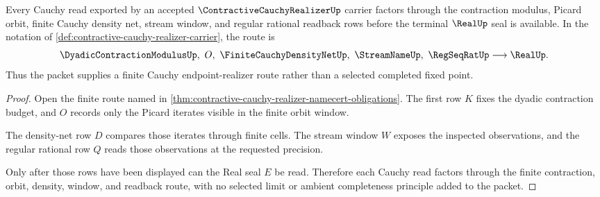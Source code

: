 \begin{theorem}
\label{thm:contractive-cauchy-realizer-cauchy-route}
Every Cauchy read exported by an accepted $\ContractiveCauchyRealizerUp$ carrier factors through the contraction modulus, Picard orbit, finite Cauchy density net, stream window, and regular rational readback rows before the terminal $\RealUp$ seal is available. In the notation of \autoref{def:contractive-cauchy-realizer-carrier}, the route is
$$
\DyadicContractionModulusUp,\ O,\ \FiniteCauchyDensityNetUp,\ \StreamNameUp,\ \RegSeqRatUp \longrightarrow \RealUp .
$$
Thus the packet supplies a finite Cauchy endpoint-realizer route rather than a selected completed fixed point.
\end{theorem}
\begin{proof}
Open the finite route named in \autoref{thm:contractive-cauchy-realizer-namecert-obligations}. The first row $K$ fixes the dyadic contraction budget, and $O$ records only the Picard iterates visible in the finite orbit window.

The density-net row $D$ compares those iterates through finite cells. The stream window $W$ exposes the inspected observations, and the regular rational row $Q$ reads those observations at the requested precision.

Only after those rows have been displayed can the Real seal $E$ be read. Therefore each Cauchy read factors through the finite contraction, orbit, density, window, and readback route, with no selected limit or ambient completeness principle added to the packet.
\end{proof}

